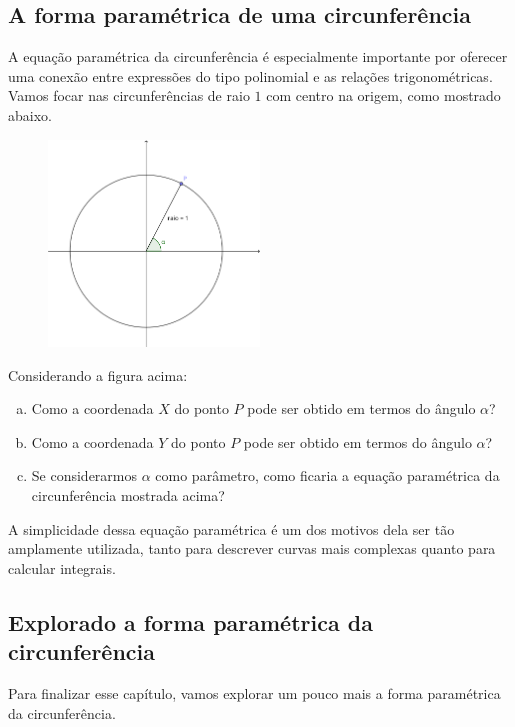 \documentclass[main_estudante.tex]{subfiles}
\begin{document}
\subsection*{A forma paramétrica de uma circunferência}

A equação paramétrica da circunferência é especialmente importante por oferecer uma conexão entre expressões do tipo polinomial e as relações trigonométricas. Vamos focar nas circunferências de raio $1$ com centro na origem, como mostrado abaixo.

\begin{figure}[h]
\centering
\includegraphics[width=0.5\textwidth]{./img/c6q15.png}
\end{figure}

\begin{questao}
Considerando a figura acima:
\begin{enumerate}[a)]
\item Como a coordenada $X$ do ponto $P$ pode ser obtido em termos do ângulo $\alpha$?
\item Como a coordenada $Y$ do ponto $P$ pode ser obtido em termos do ângulo $\alpha$?
\item Se considerarmos $\alpha$ como parâmetro, como ficaria a equação paramétrica da circunferência mostrada acima?
\end{enumerate} 
\end{questao}

A simplicidade dessa equação paramétrica é um dos motivos dela ser tão amplamente utilizada, tanto para descrever curvas mais complexas quanto para calcular integrais.

\subsection*{Explorado a forma paramétrica da circunferência}

Para finalizar esse capítulo, vamos explorar um pouco mais a forma paramétrica  da circunferência.
\end{document}
